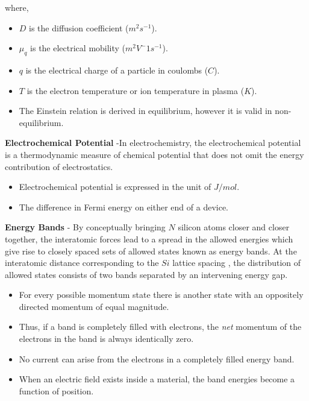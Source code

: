     where,
    \vspace{0.15cm}
    \begin{itemize}
        \setlength\itemsep{0.5em}
        \item{$D$ is the diffusion coefficient ($m^2s^{-1}$).}
        \item{$\mu_q$ is the electrical mobility ($m^2V^-1s^{-1}$).}
        \item{$q$ is the electrical charge of a particle in coulombs ($C$).}
        \item{$T$ is the electron temperature or ion temperature in plasma ($K$).}
    \end{itemize}
    \vspace{0.15cm}
    \begin{itemize}
        \setlength\itemsep{0.5em}
        \item{The Einstein relation is derived in equilibrium, however it is valid in non-equilibrium.}
    \end{itemize}
\vspace{0.5cm}
    \textbf{Electrochemical Potential} -In electrochemistry, the electrochemical potential is a thermodynamic measure of chemical potential that does not omit the energy contribution of electrostatics.
    \vspace{0.15cm}
    \begin{itemize}
        \setlength\itemsep{0.5em}
        \item{Electrochemical potential is expressed in the unit of $J/mol$.}
        \item{The difference in Fermi energy on either end of a device.}
    \end{itemize}
\vspace{0.5cm}
    \textbf{Energy Bands} - By conceptually bringing $N$ silicon atoms closer and closer together, the interatomic forces lead to a spread in the allowed energies which give rise to closely spaced sets of allowed states known as energy bands.  At the interatomic distance corresponding to the $Si$ lattice spacing , the distribution of allowed states consists of two bands separated by an intervening energy gap.
    \vspace{0.15cm}
    \begin{itemize}
        \setlength\itemsep{0.5em}
        \item{For every possible momentum state there is another state with an oppositely directed momentum of equal magnitude.}
        \item{Thus, if a band is completely filled with electrons, the \emph{net} momentum of the electrons in the band is always identically zero.}
        \item{No current can arise from the electrons in a completely filled energy band.}
        \item{When an electric field exists inside a material, the band energies become a function of position.}
    \end{itemize}
